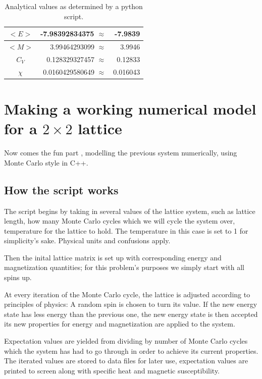 \documentclass[11pt,a4paper,notitlepage,twocolumn]{article}
\begin{document}
\begin{table}[H]
\center
\begin{tabular}{|c|r r|}\hline
	$<E>$ &-7.98392834375   $\approx$ & -7.9839\\ \hline
	$<M>$ & 3.99464293099   $\approx$ & 3.9946\\ \hline
	$C_V$ & 0.128329327457  $\approx$ & 0.12833\\ \hline
	$\chi$& 0.0160429580649 $\approx$ & 0.016043\\ \hline
\end{tabular}
\caption{Analytical values as determined by a python script.}\label{table:analyticalresults}
\end{table}

\section{Making a working numerical model for a $2\times2$ lattice}
Now comes the fun part%
, modelling the previous system numerically, using Monte Carlo style in C++.

\subsection{How the script works}
The script begins by taking in several values of the lattice system, such as lattice length, how many Monte Carlo cycles which we will cycle the system over, temperature for the lattice to hold. The temperature in this case is set to 1 for simplicity's sake. Physical units and confusions apply.

Then the inital lattice matrix is set up with corresponding energy and magnetization quantities; for this problem's purposes we simply start with all spins up.

At every iteration of the Monte Carlo cycle, the lattice is adjusted according to principles of physics: A random spin is chosen to turn its value. If the new energy state has less energy than the previous one, the new energy state is then accepted its new properties for energy and magnetization are applied to the system.

Expectation values are yielded from dividing by number of Monte Carlo cycles which the system has had to go through in order to achieve its current properties. The iterated values are stored to data files for later use, expectation values are printed to screen along with specific heat and magnetic susceptibility.
\end{document}
